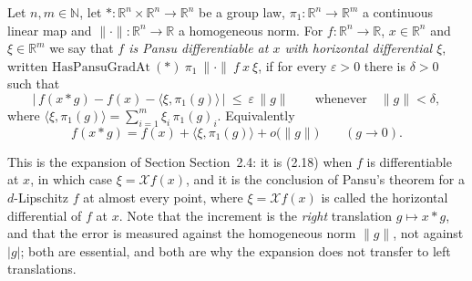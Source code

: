 \begin{definition}
Let $n,m\in\mathbb N$, let $*:\mathbb R^n\times\mathbb R^n\to\mathbb R^n$ be a group law,
$\pi_1:\mathbb R^n\to\mathbb R^m$ a continuous linear map and
$\|\cdot\|:\mathbb R^n\to\mathbb R$ a homogeneous norm. For $f:\mathbb R^n\to\mathbb R$,
$x\in\mathbb R^n$ and $\xi\in\mathbb R^m$ we say that \emph{$f$ is Pansu differentiable at
$x$ with horizontal differential $\xi$}, written
$\mathrm{HasPansuGradAt}\ (*)\ \pi_1\ \|\cdot\|\ f\ x\ \xi$, if for every $\varepsilon>0$
there is $\delta>0$ such that
\[
 \big|\,f(x*g)-f(x)-\langle\xi,\pi_1(g)\rangle\,\big|\ \le\ \varepsilon\,\|g\|
 \qquad\text{whenever}\quad \|g\|<\delta ,
\]
where $\langle\xi,\pi_1(g)\rangle=\sum_{i=1}^{m}\xi_i\,\pi_1(g)_i$. Equivalently
\[
 f(x*g)=f(x)+\langle\xi,\pi_1(g)\rangle+o\big(\|g\|\big)\qquad(g\to0).
\]

This is the expansion of Section Section~2.4: it is (2.18) when $f$ is differentiable
at $x$, in which case $\xi=\mathcal Xf(x)$, and it is the conclusion of Pansu's theorem for
a $d$-Lipschitz $f$ at almost every point, where $\xi=\mathcal Xf(x)$ is called the
horizontal differential of $f$ at $x$. Note that the increment is the \emph{right}
translation $g\mapsto x*g$, and that the error is measured against the homogeneous norm
$\|g\|$, not against $|g|$; both are essential, and both are why the expansion does not
transfer to left translations.
\end{definition}
